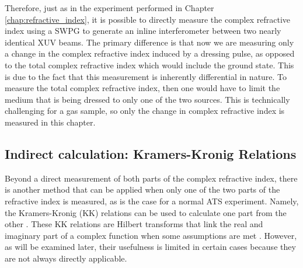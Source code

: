 Therefore, just as in the experiment performed in Chapter \ref{chap:refractive_index}, it is possible to directly measure the complex refractive index using a SWPG to generate an inline interferometer between two nearly identical XUV beams.  The primary difference is that now we are measuring only a change in the complex refractive index induced by a dressing pulse, as opposed to the total complex refractive index which would include the ground state.  This is due to the fact that this measurement is inherently differential in nature.  To measure the total complex refractive index, then one would have to limit the medium that is being dressed to only one of the two sources.  This is technically challenging for a gas sample, so only the change in complex refractive index is measured in this chapter.


\subsection{Indirect calculation: Kramers-Kronig Relations}

Beyond a direct measurement of both parts of the complex refractive index, there is another method that can be applied when only one of the two parts of the refractive index is measured, as is the case for a normal ATS experiment.  Namely, the Kramers-Kronig (KK) relations can be used to calculate one part from the other \cite{kronigTheoryDispersionXRays1926, kramersDiffusionLumierePar1927}.  These KK relations are Hilbert transforms that link the real and imaginary part of a complex function when some assumptions are met \cite{lucariniKramersKronigRelationsOptical2005}.  However, as will be examined later, their usefulness is limited in certain cases because they are not always directly applicable.


